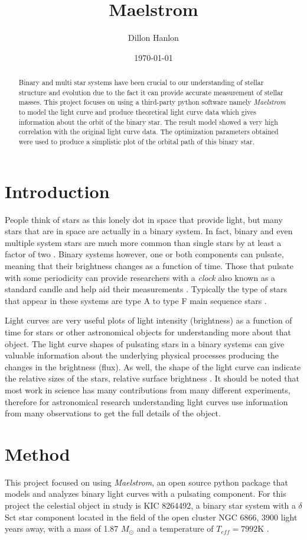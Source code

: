 \documentclass[]{article}
\title{Maelstrom}
\author{Dillon Hanlon}
\date{\today}
\begin{document}
\maketitle
\begin{abstract}
    Binary and multi star systems have been crucial to our understanding of stellar structure and evolution due to the fact it can provide accurate measurement of stellar masses. This project focuses on using a third-party python software namely \textit{Maelstrom} to model the light curve and produce theoretical light curve data which gives information about the orbit of the binary star. The result model showed a very high correlation with the original light curve data. The optimization parameters obtained were used to produce a simplistic plot of the orbital path of this binary star. 
\end{abstract}
\section{Introduction}
People think of stars as this lonely dot in space that provide light, but
many stars that are in space are actually in a binary system. In fact, binary and even multiple system stars are much more common than single stars by at least a factor of two \cite{guszejnov2017protostellar}. Binary systems however, one or both components can pulsate, meaning that their brightness changes as a function of time. Those that pulsate with some periodicity can provide researchers with a \textit{clock} also known as a standard candle and help aid their measurements  \cite{murphy2018finding}. Typically the type of stars that appear in these systems are type A to type F main sequence stars \cite{garg2010high}.

Light curves are very useful plots of light intensity (brightness) as a function of time for stars or other astronomical objects for understanding more about that object. The light curve shapes of pulsating stars in a binary systems can give valuable information about the underlying physical processes producing the changes in the brightness (flux). As well, the shape of the light curve can indicate the relative sizes of the stars, relative surface brightness \cite{russell1912determination}. It should be noted that most work in science has many contributions from many different experiments, therefore for astronomical research understanding light curves use information from many observations to get the full details of the object.

\section{Method}
This project focused on using \textit{Maelstrom}, an open source python package that models and analyzes binary light curves with a pulsating component. For this project the celestial object in study is KIC 8264492, a binary star system with a $\delta$ Sct star component located in the field of the open cluster NGC 6866, 3900 light years away, with a mass of 1.87 $M_{\odot}$ and a temperature of $T_{eff} = 7992$K \cite{balona2013pulsation,shibahashi2015fm}.
\end{document}
